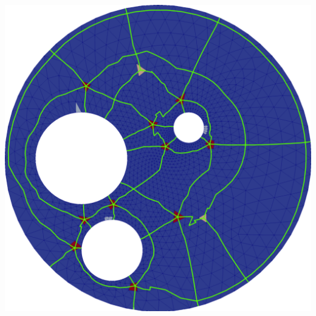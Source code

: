\documentclass[a0paper,portrait, fontscale=0.30]{baposter}
\begin{document}
\begin{poster}
{%
 \noindent
 \vspace{0.41cm}
 \begin{minipage}[b]{0.38\linewidth}%
\includegraphics[width=\textwidth]{CWCH_coarse-shortest_paths}%
\end{minipage}
\begin{minipage}[b]{0.25\linewidth}

\end{minipage}}
\end{poster}
\end{document}
